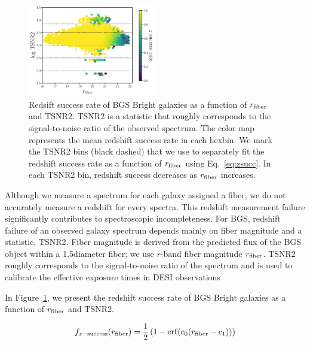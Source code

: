 \begin{figure}[h]
\begin{center}
    \includegraphics[width=0.5\textwidth]{figs/bgs_bright_rfib_tsnr2.pdf} 
    \caption{
        Redsift success rate of BGS Bright galaxies as a function of 
        $r_{\rm fiber}$ and TSNR2.
        TSNR2 is a statistic that roughly corresponds to the signal-to-noise
        ratio of the observed spectrum. 
        The color map represents the mean redshift success rate in each hexbin.
        We mark the TSNR2 bins (black dashed) that we use to separately fit the
        redshift success rate as a function of $r_{\rm fiber}$ using
        Eq.~\ref{eq:zsucc}.
        In each TSNR2 bin, redshift success decreases as $r_{\rm fiber}$
        increases. 
    }\label{fig:zfail0}
\end{center}
\end{figure}

Although we measure a spectrum for each galaxy assigned a fiber, we do not
accurately measure a redshift for every spectra. 
This redshift measurement failure significantly contributes to spectroscopic
incompleteness. 
For BGS, redshift failure of an observed galaxy spectrum depends mainly on
fiber magnitude and a statistic, TSNR2.
Fiber magnitude is derived from the predicted flux of the BGS object within a
1.5\arcsec diameter fiber; we use $r$-band fiber magnitude $r_{\rm fiber}$. 
TSNR2 roughly corresponds to the signal-to-noise ratio of the spectrum and is 
used to calibrate the effective exposure times in DESI observations

In Figure~\ref{fig:zfail0}, we present the redshift success rate of BGS Bright
galaxies as a function of $r_{\rm fiber}$ and TSNR2.

\begin{equation} \label{eq:zsucc}
    f_{z-{\rm success}}(r_{\rm fiber}) = \frac{1}{2} \left(1-{\rm erf}(c_0 (r_{\rm fiber} - c_1))\right)
\end{equation}


